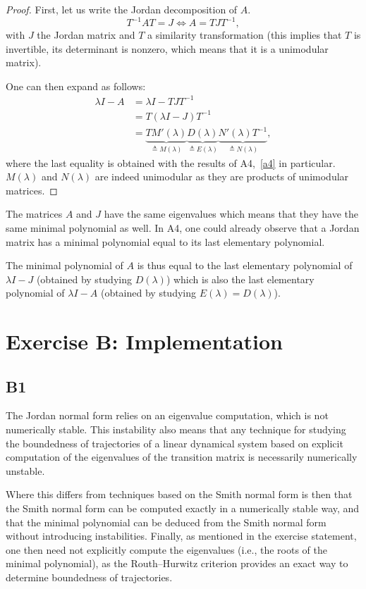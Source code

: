 \documentclass[11pt]{article}
\begin{document}
\begin{proof}
First, let us write the Jordan decomposition of \(A\).
\[
T^{-1} A T =J \iff A= T J T^{-1},
\]
with $J$ the Jordan matrix and $T$ a similarity transformation (this implies that $T$ is invertible, its determinant is nonzero, which means that it is a unimodular matrix).

One can then expand as follows:
\begin{align*}
\lambda I - A &= \lambda I - T J T^{-1}\\
&= T(\lambda I - J) T^{-1}\\
&= \underbrace{TM'(\lambda)}_{\triangleq M(\lambda)}\underbrace{D(\lambda)}_{\triangleq E(\lambda)}\underbrace{N'(\lambda)T^{-1}}_{\triangleq N(\lambda)},
\end{align*}
where the last equality is obtained with the results of A4,~\eqref{a4} in particular.
$M(\lambda)$ and $N(\lambda)$ are indeed unimodular as they are products of unimodular matrices.
\end{proof}

The matrices $A$ and $J$ have the same eigenvalues which means that they have the same minimal polynomial as well.
In A4, one could already observe that a Jordan matrix has a minimal polynomial equal to its last elementary polynomial.

The minimal polynomial of $A$ is thus equal to the last elementary polynomial of $\lambda I - J$ (obtained by studying $D(\lambda)$) which is also the last elementary polynomial of $\lambda I - A$ (obtained by studying $E(\lambda) = D(\lambda)$).

\section*{Exercise B: Implementation}
\subsection*{B1}
The Jordan normal form relies on an eigenvalue computation, which is not numerically stable.
This instability also means that any technique for studying the boundedness of trajectories of a linear dynamical system based on explicit computation of the eigenvalues of the transition matrix is necessarily numerically unstable.

Where this differs from techniques based on the Smith normal form is then that the Smith normal form can be computed exactly in a numerically stable way, and that the minimal polynomial can be deduced from the Smith normal form without introducing instabilities.
Finally, as mentioned in the exercise statement, one then need not explicitly compute the eigenvalues (i.e., the roots of the minimal polynomial), as the Routh--Hurwitz criterion provides an exact way to determine boundedness of trajectories.
\end{document}
